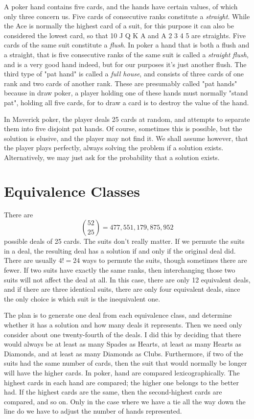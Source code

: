 \documentclass [12pt, letterpaper] {article}
\begin{document}
A poker hand contains five cards, and the hands have certain values, of which only three concern us.
Five cards of consecutive ranks constitute a \textit{straight}.  While the Ace is normally the highest 
card of a suit, for this purpose it can also be considered the lowest card, so that 10 J Q K A and A 2 3 4 5
are straights.  Five cards of the same suit  constitute a \textit{flush}.  In poker a hand that is both a
flush and a straight, that is five consecutive ranks of the same suit is called a \textit{straight flush}, 
and is a very good hand indeed, but for our purposes it's just another flush.  The third type
of "pat hand" is called a \textit{full house}, and consists of three cards of one rank and two cards of another rank.
These are presumably called "pat hands" because in draw poker, a player holding one of these
hands must normally "stand pat", holding all five cards, for to draw a card is to destroy the 
value of the hand.

In Maverick poker, the player deals 25 cards at random, and attempts to separate them into five disjoint pat hands.
Of course, sometimes this is possible, but the solution is elusive, and the player may not find it.
We shall assume however, that the player plays perfectly, always solving the problem if a solution exists.  
Alternatively, we may just ask for the probability that a solution exists.

\section*{Equivalence Classes}
There are \[\binom{52}{25}=477,551,179,875,952\] possible deals of 25 cards.  The suits don't really matter.  
If we permute the suits in a deal, the resulting deal has a solution if and only if the original deal did.  There are usually $4! =24$ ways to 
permute the suits, though sometimes there are fewer.  If two suits have exactly the same ranks, then interchanging those
two suits will not affect the deal at all.  In this case, there are only 12 equivalent deals, and if there are three identical suits, 
there are only four equivalent deals, since the only choice is which suit is the inequivalent one.

The plan is to generate one deal from each equivalence class, and determine whether it has a solution and how many deals it represents.
Then we need only consider about one twenty-fourth of the deals.  I did this by deciding that there would always be at least
as many Spades as Hearts, at least as many Hearts as Diamonds, and at least as many Diamonds as Clubs.  Furthermore,
if two of the suits had the same number of cards, then the suit that would normally be longer
will have the higher cards.  In poker, hand are compared lexicographically.  The highest cards in each hand are compared; the higher one belongs to the 
better had.  If the highest cards are the same, then the second-highest cards are compared, and so on.  Only
in the case where we have a tie all the way down the line do we have to adjust the number of hands represented.
\end{document}
